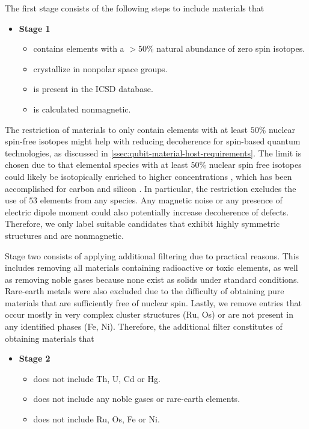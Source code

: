 The first stage consists of the following steps to include materials that
\begin{itemize}
  \item[]{\textbf{Stage 1}}
  \begin{itemize}
  \item contains elements with a $>50\%$ natural abundance of zero spin isotopes.
  \item crystallize in nonpolar space groups.
  \item is present in the ICSD database.
  \item is calculated nonmagnetic.
  \end{itemize}
\end{itemize}

\noindent The restriction of materials to only contain elements with at least $50\%$ nuclear spin-free isotopes might help with reducing decoherence for spin-based quantum technologies, as discussed in \autoref{ssec:qubit-material-host-requirements}.
The limit is chosen due to that elemental species with at least $50\%$ nuclear spin free isotopes could likely be isotopically enriched to higher concentrations \cite{Ferrenti2020}, which has been accomplished for carbon \cite{Markham2011, Balasubramanian2009} and silicon \cite{Tyryshkin2011}. In particular, the restriction excludes the use of $53$ elements from any species. Any magnetic noise or any presence of electric dipole moment could also potentially increase decoherence of defects. Therefore, we only label suitable candidates that exhibit highly symmetric structures and are nonmagnetic.

Stage two consists of applying additional filtering due to practical reasons. This includes removing all materials containing radioactive or toxic elements, as well as removing noble gases because none exist as solids under standard conditions. Rare-earth metals were also excluded due to the difficulty of obtaining pure materials that are sufficiently free of nuclear spin. Lastly, we remove entries that occur mostly in very complex cluster structures (Ru, Os) or are not present in any identified phases (Fe, Ni). Therefore, the additional filter constitutes of obtaining materials that
\begin{itemize}
  \item[]{\textbf{Stage 2}}
  \begin{itemize}
  \item does not include Th, U, Cd or Hg.
  \item does not include any noble gases or rare-earth elements.
  \item does not include Ru, Os, Fe or Ni.
  \end{itemize}
\end{itemize}


